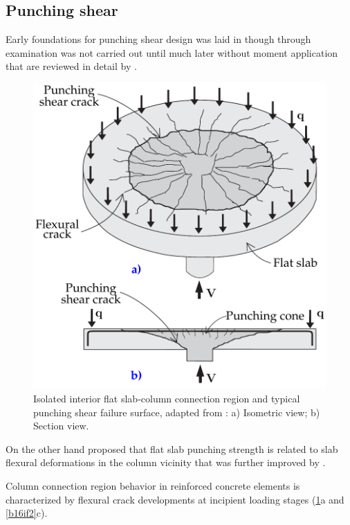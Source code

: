 \documentclass[twocolumn]{article} %
\begin{document}
\subsection{Punching shear}
Early foundations for punching shear design was laid in \cite{talbot1913reinforced} though through examination was not carried out until much later \citep{elstner1956shearing,moe1961} without moment application that are reviewed in detail by \cite{ghoreishi2013review,yang2011data,hamada2008evaluation}. 
\begin{figure}\centering
    \includegraphics[width=\columnwidth]{Figures/tikzout/b16if1.pdf}\caption{Isolated interior flat slab-column connection region and typical punching shear failure surface, adapted from \cite{bompa2016b}: a) Isometric view; b) Section view.}\label{b16if1}
    \end{figure}
On the other hand \cite{kinnunen1960} proposed that flat slab punching strength is related to slab flexural deformations in the column vicinity that was further improved by \cite{shehata1989punching,broms1990}.

Column connection region behavior in reinforced concrete elements is characterized by flexural crack developments at incipient loading stages (\ref{b16if1}a and \ref{b16if2}c). 
\end{document}

